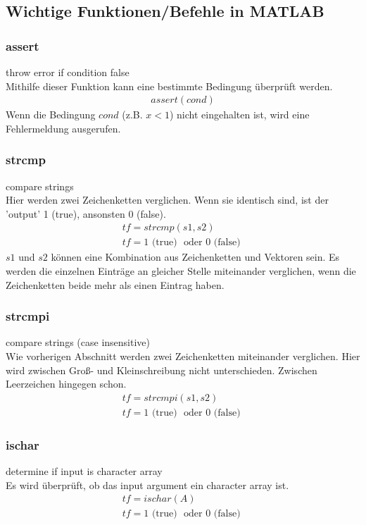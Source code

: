 \documentclass[12pt,bibstyle=none,pagenumberinfooter]{ifmdocument}
\begin{document}
\subsection{Wichtige Funktionen/Befehle in MATLAB}
\subsubsection{assert}
\glqq throw error if condition false\grqq{}\\
Mithilfe dieser Funktion kann eine bestimmte Bedingung \"uberpr\"uft werden. 
\begin{gather*}
	assert(cond)
\end{gather*}
Wenn die Bedingung $cond$ (z.B. $x < 1$) nicht eingehalten ist, wird eine Fehlermeldung ausgerufen.
\subsubsection{strcmp}
\glqq compare strings\grqq{}\\
Hier werden zwei Zeichenketten verglichen. Wenn sie identisch sind, ist der 'output' 1 (true), ansonsten 0 (false). 
\begin{gather*}
	tf = strcmp(s1,s2)\\
	tf = 1 \text{ (true) } \text{ oder } 0 \text{ (false) }
\end{gather*}
$s1$ und $s2$ k\"onnen eine Kombination aus Zeichenketten und Vektoren sein. Es werden die einzelnen Eintr\"age an gleicher Stelle miteinander verglichen, wenn die Zeichenketten beide mehr als einen Eintrag haben.
\subsubsection{strcmpi}
\glqq  compare strings (case insensitive)\grqq{}\\
Wie vorherigen Abschnitt werden zwei Zeichenketten miteinander verglichen. Hier wird zwischen Groß- und Kleinschreibung nicht unterschieden. Zwischen Leerzeichen hingegen schon. 
\begin{gather*}
	tf = strcmpi(s1,s2)\\
	tf = 1 \text{ (true) } \text{ oder } 0 \text{ (false) }
\end{gather*}
\subsubsection{ischar}
\glqq determine if input is character array\grqq{}\\
Es wird \"uberpr\"uft, ob das \glqq input argument\grqq{} ein \glqq character array\grqq{} ist.
\begin{gather*}
	tf = ischar(A)\\
	tf = 1 \text{ (true) } \text{ oder } 0 \text{ (false) }
\end{gather*}
\end{document}
